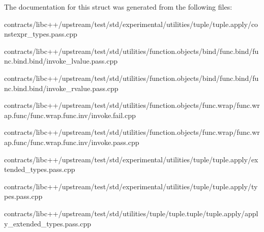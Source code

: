 The documentation for this struct was generated from the following files\+:\begin{DoxyCompactItemize}
\item 
contracts/libc++/upstream/test/std/experimental/utilities/tuple/tuple.\+apply/constexpr\+\_\+types.\+pass.\+cpp\item 
contracts/libc++/upstream/test/std/utilities/function.\+objects/bind/func.\+bind/func.\+bind.\+bind/invoke\+\_\+lvalue.\+pass.\+cpp\item 
contracts/libc++/upstream/test/std/utilities/function.\+objects/bind/func.\+bind/func.\+bind.\+bind/invoke\+\_\+rvalue.\+pass.\+cpp\item 
contracts/libc++/upstream/test/std/utilities/function.\+objects/func.\+wrap/func.\+wrap.\+func/func.\+wrap.\+func.\+inv/invoke.\+fail.\+cpp\item 
contracts/libc++/upstream/test/std/utilities/function.\+objects/func.\+wrap/func.\+wrap.\+func/func.\+wrap.\+func.\+inv/invoke.\+pass.\+cpp\item 
contracts/libc++/upstream/test/std/experimental/utilities/tuple/tuple.\+apply/extended\+\_\+types.\+pass.\+cpp\item 
contracts/libc++/upstream/test/std/experimental/utilities/tuple/tuple.\+apply/types.\+pass.\+cpp\item 
contracts/libc++/upstream/test/std/utilities/tuple/tuple.\+tuple/tuple.\+apply/apply\+\_\+extended\+\_\+types.\+pass.\+cpp\end{DoxyCompactItemize}
